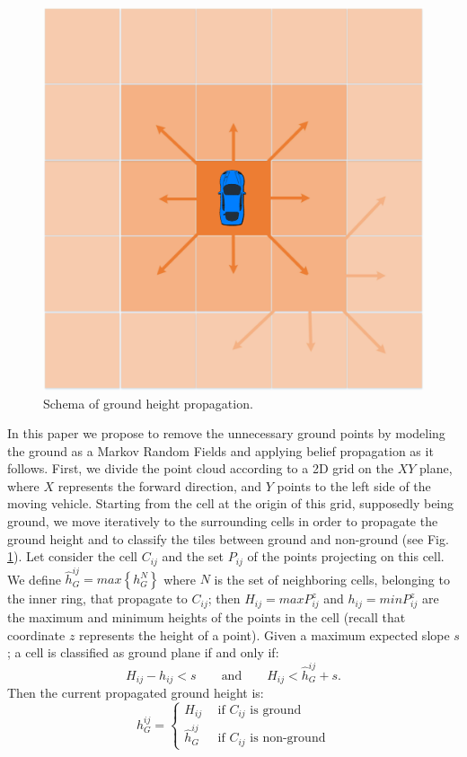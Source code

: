 \begin{figure}[t]
\centering
\includegraphics[width=0.4\columnwidth]{./img/ch-laser/groundpropagation}
\caption{Schema of ground height propagation.}
\label{fig:propag}
\end{figure}

In this paper we propose to remove the unnecessary ground points by modeling the ground as a Markov Random Fields and applying belief propagation as it follows. 
First, we divide the point cloud according to a 2D grid on the $XY$ plane, where $X$ represents the forward direction, and $Y$ points to the left side of the moving vehicle. 
Starting from the cell at the origin of this grid, supposedly being ground, we move iteratively to the surrounding cells in order to propagate the ground height and to classify the tiles between ground and non-ground (see Fig. \ref{fig:propag}).
Let consider the cell $C_{ij}$ and the set $P_{ij}$ of the points projecting on this cell. We define $\hat{h}_G^{ij} = max\left\{h_G^N\right\}$ where $N$ is the set of neighboring cells, belonging to the inner ring, that propagate to  $C_{ij}$; then $H_{ij} = max{P_{ij}^z}$ and $h_{ij} = min{P_{ij}^z}$ are the maximum and minimum heights of the points in the cell (recall that coordinate $z$ represents the height of a point). 
Given a maximum expected slope $s$; a cell is classified as ground plane if and only if:
\begin{equation}
H_{ij} - h_{ij} < s \qquad \text{and} \qquad H_{ij} < \hat{h}_G^{ij} + s.
\end{equation}
Then the current propagated ground height is:
\begin{equation}
   h_G^{ij} =  
      \begin{cases}
               H_{ij} \ \ & \text{if ${C}_{ij}$ is ground}\\
               \hat{h}_G^{ij} \ \ & \text{if ${C}_{ij}$ is non-ground}
        \end{cases}
\end{equation}

